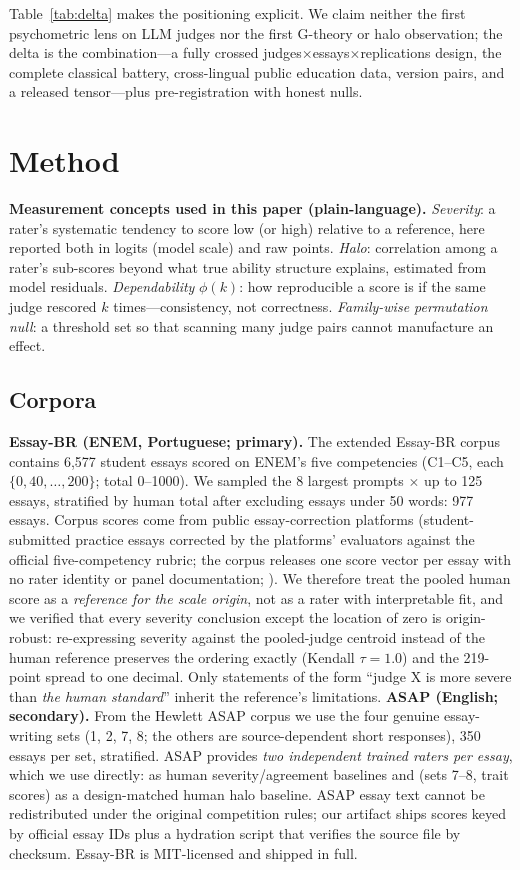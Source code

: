 \documentclass[fleqn,10pt]{JLA_article}
\begin{document}
Table~\ref{tab:delta} makes the positioning explicit. We claim neither the first psychometric lens on LLM judges nor the first G-theory or halo
observation; the delta is the combination---a fully crossed judges$\times$essays$\times$replications
design, the complete classical battery, cross-lingual public education data, version pairs, and a
released tensor---plus pre-registration with honest nulls.

\section{Method}
\label{sec:method}
\medskip\noindent\textbf{Measurement concepts used in this paper (plain-language).} \emph{Severity}: a rater's systematic tendency to score low (or high) relative to a reference, here reported both in logits (model scale) and raw points. \emph{Halo}: correlation among a rater's sub-scores beyond what true ability structure explains, estimated from model residuals. \emph{Dependability} $\phi(k)$: how reproducible a score is if the same judge rescored $k$ times---consistency, not correctness. \emph{Family-wise permutation null}: a threshold set so that scanning many judge pairs cannot manufacture an effect.

\subsection{Corpora}

\textbf{Essay-BR (ENEM, Portuguese; primary).} The extended Essay-BR corpus \cite{marinho2021}
contains 6{,}577 student essays scored on ENEM's five competencies (C1--C5, each
$\{0,40,\dots,200\}$; total 0--1000). We sampled the 8 largest prompts $\times$ up to 125 essays,
stratified by human total after excluding essays under 50 words: 977 essays. Corpus scores come from public essay-correction platforms (student-submitted practice essays
corrected by the platforms' evaluators against the official five-competency rubric; the corpus
releases one score vector per essay with no rater identity or panel documentation; ). We therefore treat the pooled human score as a \emph{reference
for the scale origin}, not as a rater with interpretable fit, and we verified that every
severity conclusion except the location of zero is origin-robust: re-expressing severity against
the pooled-judge centroid instead of the human reference preserves the ordering exactly
(Kendall $\tau = 1.0$) and the 219-point spread to one decimal. Only statements of the form
``judge X is more severe than \emph{the human standard}'' inherit the reference's limitations.
\textbf{ASAP (English; secondary).} From the Hewlett ASAP corpus \cite{hewlett2012} we use the
four genuine essay-writing sets (1, 2, 7, 8; the others are source-dependent short responses),
350 essays per set, stratified. ASAP provides \emph{two independent trained raters per essay},
which we use directly: as human severity/agreement baselines and (sets 7--8, trait scores) as a
design-matched human halo baseline. ASAP essay text cannot be redistributed under the original
competition rules; our artifact ships scores keyed by official essay IDs plus a hydration script
that verifies the source file by checksum. Essay-BR is MIT-licensed and shipped in full.
\end{document}

